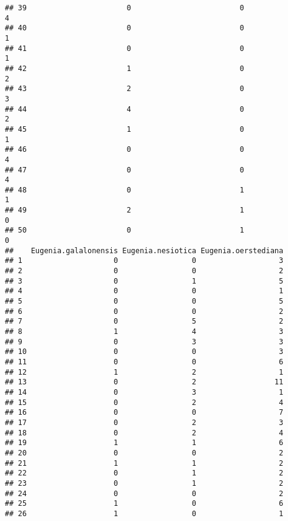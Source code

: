 \documentclass[
]{article}
\begin{document}
\begin{verbatim}
## 39                       0                         0               4
## 40                       0                         0               1
## 41                       0                         0               1
## 42                       1                         0               2
## 43                       2                         0               3
## 44                       4                         0               2
## 45                       1                         0               1
## 46                       0                         0               4
## 47                       0                         0               4
## 48                       0                         1               1
## 49                       2                         1               0
## 50                       0                         1               0
##    Eugenia.galalonensis Eugenia.nesiotica Eugenia.oerstediana
## 1                     0                 0                   3
## 2                     0                 0                   2
## 3                     0                 1                   5
## 4                     0                 0                   1
## 5                     0                 0                   5
## 6                     0                 0                   2
## 7                     0                 5                   2
## 8                     1                 4                   3
## 9                     0                 3                   3
## 10                    0                 0                   3
## 11                    0                 0                   6
## 12                    1                 2                   1
## 13                    0                 2                  11
## 14                    0                 3                   1
## 15                    0                 2                   4
## 16                    0                 0                   7
## 17                    0                 2                   3
## 18                    0                 2                   4
## 19                    1                 1                   6
## 20                    0                 0                   2
## 21                    1                 1                   2
## 22                    0                 1                   2
## 23                    0                 1                   2
## 24                    0                 0                   2
## 25                    1                 0                   6
## 26                    1                 0                   1

\end{verbatim}
\end{document}
